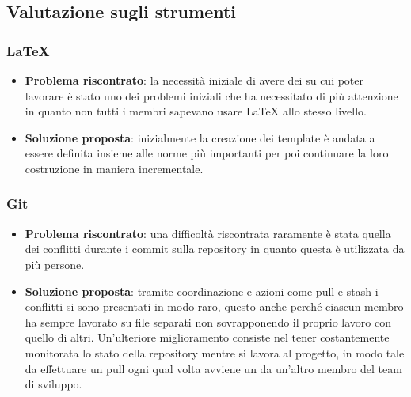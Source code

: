 	\subsection{Valutazione sugli strumenti}

		\subsubsection{\LaTeX}
			\begin{itemize}
				\item \textbf{Problema riscontrato}: la necessità iniziale di avere dei  su cui poter lavorare è stato uno dei problemi iniziali che ha necessitato di più attenzione in quanto non tutti i membri sapevano usare {\LaTeX} allo stesso livello.
				\item \textbf{Soluzione proposta}: inizialmente la creazione dei template è andata a essere definita insieme alle norme più importanti per poi continuare la loro costruzione in maniera incrementale.
			\end{itemize}
		
		\subsubsection{Git}
			\begin{itemize}
				\item \textbf{Problema riscontrato}: una difficoltà riscontrata raramente è stata quella dei conflitti durante i commit sulla repository in quanto questa è utilizzata da più persone.
				\item \textbf{Soluzione proposta}: tramite coordinazione e azioni come pull e stash i conflitti si sono presentati in modo raro, questo anche perché ciascun membro ha sempre lavorato su file separati non sovrapponendo il proprio lavoro con quello di altri. Un'ulteriore miglioramento consiste nel tener costantemente monitorata lo stato della repository mentre si lavora al progetto, in modo tale da effettuare un pull ogni qual volta avviene un  da un'altro membro del team di sviluppo. 
			\end{itemize}
		
